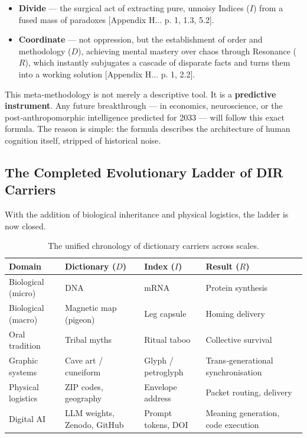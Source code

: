 \documentclass[12pt,a4paper]{article}
\begin{document}
	\begin{itemize}[leftmargin=*]
		\item \textbf{Divide} — the surgical act of extracting pure, unnoisy Indices (\(I\)) from a fused mass of paradoxes [Appendix H... p. 1, 1.3, 5.2].
		\item \textbf{Coordinate} — not oppression, but the establishment of order and methodology (\(D\)), achieving mental mastery over chaos through Resonance (\(R\)), which instantly subjugates a cascade of disparate facts and turns them into a working solution [Appendix H... p. 1, 2.2].
	\end{itemize}
	
	This meta‑methodology is not merely a descriptive tool. It is a \textbf{predictive instrument}. Any future breakthrough — in economics, neuroscience, or the post‑anthropomorphic intelligence predicted for 2033 — will follow this exact formula. The reason is simple: the formula describes the architecture of human cognition itself, stripped of historical noise.
	
	\subsection{The Completed Evolutionary Ladder of DIR Carriers}
	
	With the addition of biological inheritance and physical logistics, the ladder is now closed.
	
	\begin{table}[htbp]
		\centering
		\caption{The unified chronology of dictionary carriers across scales.}
		\label{tab:dir-ladder}
		\small
		\begin{tabular}{p{3cm}p{3.5cm}p{3.5cm}p{3cm}}
			\toprule
			\textbf{Domain} & \textbf{Dictionary (\(D\))} & \textbf{Index (\(I\))} & \textbf{Result (\(R\))} \\
			\midrule
			Biological (micro) & DNA & mRNA & Protein synthesis \\
			Biological (macro) & Magnetic map (pigeon) & Leg capsule & Homing delivery \\
			Oral tradition & Tribal myths & Ritual taboo & Collective survival \\
			Graphic systems & Cave art / cuneiform & Glyph / petroglyph & Trans‑generational synchronisation \\
			Physical logistics & ZIP codes, geography & Envelope address & Packet routing, delivery \\
			Digital AI & LLM weights, Zenodo, GitHub & Prompt tokens, DOI & Meaning generation, code execution \\
			\bottomrule
		\end{tabular}
	\end{table}
	
\end{document}
